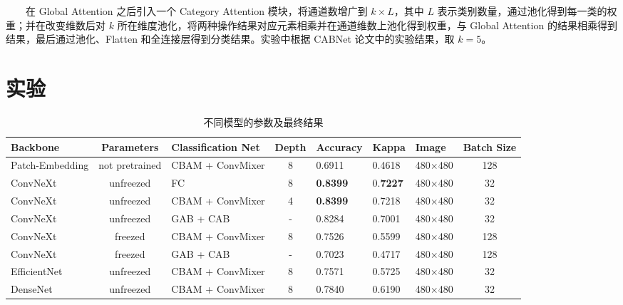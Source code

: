 \documentclass[twocolumn, fontsize=10pt]{article}
\begin{document}
　　在 Global Attention 之后引入一个 Category Attention 模块，将通道数增广到 $k\times L$，其中 $L$ 表示类别数量，通过池化得到每一类的权重；并在改变维数后对 $k$ 所在维度池化，将两种操作结果对应元素相乘并在通道维数上池化得到权重，与 Global Attention 的结果相乘得到结果，最后通过池化、Flatten 和全连接层得到分类结果。实验中根据 CABNet 论文中的实验结果，取 $k=5$。

\section{实验}


\begin{table}[h!]
    \centering
    \begin{tabular}{lclclllc}
        \toprule
        Backbone        & Parameters     & Classification Net & Depth & Accuracy        & Kappa           & Image          & Batch Size \\
        \midrule
        Patch-Embedding & not pretrained & CBAM + ConvMixer   & 8     & 0.6911          & 0.4618          & 480$\times$480 & 128        \\
        ConvNeXt        & unfreezed      & FC                 & 8     & \textbf{0.8399} & 0.\textbf{7227} & 480$\times$480 & 32         \\
        ConvNeXt        & unfreezed      & CBAM + ConvMixer   & 4     & \textbf{0.8399} & 0.7218          & 480$\times$480 & 32         \\
        ConvNeXt        & unfreezed      & GAB + CAB          & -     &  0.8284         & 0.7001          & 480$\times$480 & 32         \\
        ConvNeXt        & freezed        & CBAM + ConvMixer   & 8     & 0.7526          & 0.5599          & 480$\times$480 & 128        \\
        ConvNeXt        & freezed        & GAB + CAB          & -     &  0.7023         & 0.4717          & 480$\times$480 & 128        \\
        EfficientNet    & unfreezed      & CBAM + ConvMixer   & 8     & 0.7571          & 0.5725          & 480$\times$480 & 32         \\
        DenseNet        & unfreezed      & CBAM + ConvMixer   & 8     & 0.7840          & 0.6190          & 480$\times$480 & 32         \\
        \bottomrule
    \end{tabular}
    \caption{不同模型的参数及最终结果}
    \label{tab:summary}
\end{table}
\end{document}
